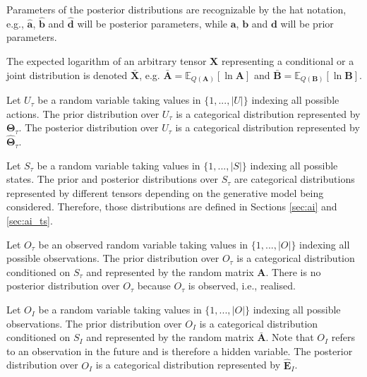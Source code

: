 \documentclass[twoside,11pt]{article}
\begin{document}
\begin{remark}
Parameters of the posterior distributions are recognizable by the hat notation, e.g., $\bm{\hat{a}}$, $\bm{\hat{b}}$ and $\bm{\hat{d}}$ will be posterior parameters, while $\bm{a}$, $\bm{b}$ and $\bm{d}$ will be prior parameters.
\end{remark}

\begin{remark}
The expected logarithm of an arbitrary tensor $\bm{X}$ representing a conditional or a joint distribution is denoted $\bm{\bar{X}}$, e.g. $\bm{\bar{A}} = \mathbb{E}_{Q(\bm{A})}[\ln \bm{A}]$ and $\bm{\bar{B}} = \mathbb{E}_{Q(\bm{B})}[\ln \bm{B}]$.
\end{remark}

\begin{definition}
Let $U_\tau$ be a random variable taking values in $\{1, ..., |U|\}$ indexing all possible actions. The prior distribution over $U_\tau$ is a categorical distribution represented by $\bm{\Theta}_\tau$. The posterior distribution over $U_\tau$ is a categorical distribution represented by $\bm{\hat{\Theta}}_\tau$.
\end{definition}

\begin{definition}
Let $S_\tau$ be a random variable taking values in $\{1, ..., |S|\}$ indexing all possible states. The prior and posterior distributions over $S_\tau$ are categorical distributions represented by different tensors depending on the generative model being considered. Therefore, those distributions are defined in Sections \ref{sec:ai} and \ref{sec:ai_ts}.
\end{definition}

\begin{definition}
Let $O_\tau$ be an observed random variable taking values in $\{1, ..., |O|\}$ indexing all possible observations. The prior distribution over $O_\tau$ is a categorical distribution conditioned on $S_\tau$ and represented by the random matrix $\bm{A}$. There is no posterior distribution over $O_\tau$ because $O_\tau$ is observed, i.e., realised.
\end{definition}

\begin{definition}
Let $O_I$ be a random variable taking values in $\{1, ..., |O|\}$ indexing all possible observations. The prior distribution over $O_I$ is a categorical distribution conditioned on $S_I$ and represented by the random matrix $\bm{\bar{A}}$. Note that $O_I$ refers to an observation in the future and is therefore a hidden variable. The posterior distribution over $O_I$ is a categorical distribution represented by $\bm{\hat{E}}_I$.
\end{definition}
\end{document}
